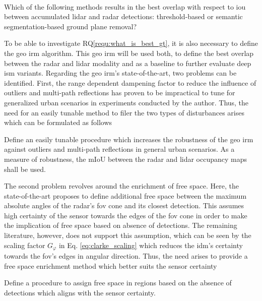 \\
\begin{requ} \label{requ:what_is_best_gt}
	Which of the following methods results in the best overlap with respect to \gls{iou} between accumulated lidar and radar detections: threshold-based or semantic segmentation-based ground plane removal?
\end{requ}
To be able to investigate RQ\ref{requ:what_is_best_gt}, it is also necessary to define the geo \gls{irm} algorithm. This geo \gls{irm} will be used both, to define the best overlap between the radar and lidar modality and as a baseline to further evaluate deep \gls{ism} variants. Regarding the geo \gls{irm}'s state-of-the-art, two problems can be identified. First, the range dependent dampening factor to reduce the influence of outliers and multi-path reflections has proven to be impractical to tune for generalized urban scenarios in experiments conducted by the author. Thus, the need for an easily tunable method to filer the two types of disturbances arises which can be formulated as follows
\\
\begin{requ} \label{requ:filter_outliers_in_geo_irm}
	Define an easily tunable procedure which increases the robustness of the geo \gls{irm} against outliers and multi-path reflections in general urban scenarios. As a measure of robustness, the mIoU between the radar and lidar occupancy maps shall be used.
\end{requ}
The second problem revolves around the enrichment of free space. Here, the state-of-the-art proposes to define additional free space between the maximum absolute angles of the radar's \gls{fov} cone and its closest detection. This assumes high certainty of the sensor towards the edges of the \gls{fov} cone in order to make the implication of free space based on absence of detections. The remaining literature, however, does not support this assumption, which can be seen by the scaling factor $G_\varphi$ in Eq. \ref{eq:clarke_scaling} which reduces the \gls{idm}'s certainty towards the \gls{fov}'s edges in angular direction. Thus, the need arises to provide a free space enrichment method which better suits the sensor certainty
\\
\begin{requ} \label{requ:fr_space_enrichment}
	Define a procedure to assign free space in regions based on the absence of detections which aligns with the sensor certainty.
\end{requ}

